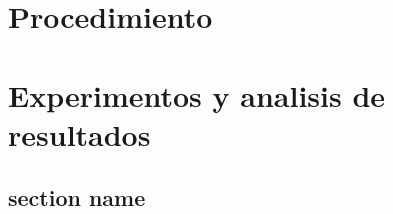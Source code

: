 \newpage
\chapter{Procedimiento}
\newpage
\chapter{Experimentos y analisis de resultados}
\section{section name}

